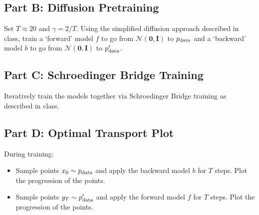 \documentclass{article}
\begin{document}
\subsection*{Part B: Diffusion Pretraining}

Set $T \approx 20$ and $\gamma = 2/T$.
Using the simplified diffusion approach described in class, train a `forward' model $f$ to go from $\mathcal{N}(\mathbf{0}, \mathbf{I})$ to $p_{\textnormal{data}}$ and a `backward' model $b$ to go from $\mathcal{N}(\mathbf{0}, \mathbf{I})$ to $p_{\textnormal{data}}'$.

\subsection*{Part C: Schroedinger Bridge Training}

Iteratively train the models together via Schroedinger Bridge training as described in class.

\subsection*{Part D: Optimal Transport Plot}

During training:
\begin{itemize}
    \item Sample points $x_0 \sim p_{\textnormal{data}}$ and apply the backward model $b$ for $T$ steps. Plot the progression of the points.
    \item Sample points $y_T \sim p_{\textnormal{data}}'$ and apply the forward model $f$ for $T$ steps. Plot the progression of the points.
\end{itemize}
\end{document}
